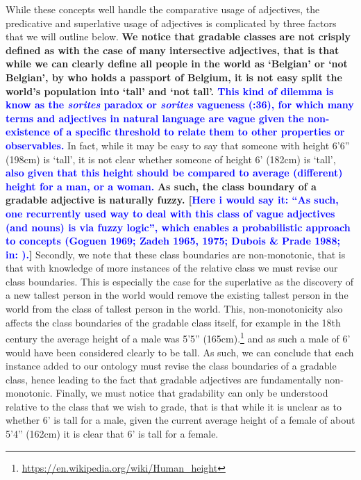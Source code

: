 \documentclass[11pt]{article}
\begin{document}
While these concepts well handle the comparative usage of adjectives, the 
predicative and superlative usage of adjectives is complicated by three factors
that we will outline below. \textbf{We notice that gradable classes are not 
crisply defined as with the case of many intersective adjectives, that is that 
while we can clearly define all people in the world as `Belgian' or 
`not Belgian', by who holds a passport of Belgium, it is not easy 
split the world's population into `tall' and `not tall'. \textcolor{blue}{This kind of dilemma is know as the \textit{sorites} paradox or \textit{sorites} vagueness (\cite{Bennett06kr}:36), for which many terms and adjectives in natural language are vague given the non-existence of a specific threshold to relate them to other properties or observables.}} In fact, while it may 
be easy to say that someone with height 6'6'' (198cm) is `tall', it is not clear 
whether someone of height 6' (182cm) is `tall', \textbf{\textcolor{blue}{also given that this height should be compared to average (different)
height for a man, or a woman.}} \textbf{As such, the class boundary of a gradable adjective is 
naturally fuzzy. [\textcolor{blue}{Here i would say it: ``As such, one recurrently used way to deal with this class of vague adjectives (and nouns) is via fuzzy logic'', which enables a probabilistic approach to concepts (Goguen 1969; Zadeh 1965, 1975; Dubois \& Prade 1988; in: \cite{Bennett06kr}).}]} Secondly, we note that these class boundaries are 
non-monotonic, that is that with knowledge of more instances of the relative 
class we must revise our class boundaries. This is especially the case for the
superlative as the discovery of a new tallest person in the world would remove 
the existing tallest person in the world from the class of tallest person in the 
world. This, non-monotonicity also affects the class boundaries of the gradable 
class itself, for example in the 18th century the average height of a male was 
5'5'' (165cm).\footnote{\url{https://en.wikipedia.org/wiki/Human_height}}
and as such a male of 6' would have been considered clearly to be 
tall. As such, we can conclude that each instance added to our ontology must 
revise the class boundaries of a gradable class, hence leading to the fact that 
gradable adjectives are fundamentally non-monotonic. Finally, we must notice 
that gradability can only be understood relative to the class that we wish to 
grade, that is that while it is unclear as to whether 6' is tall for a male, 
given the current average height of a female of about 5'4'' (162cm) it is clear 
that 6' is tall for a female.
\end{document}
